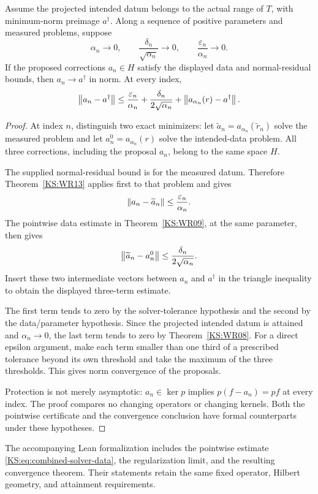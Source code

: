 \begin{KStheorem}\label{KS:WR16}
Assume the projected intended datum belongs to the actual range of $T$, with minimum-norm preimage $a^\dagger$. Along a sequence of positive parameters and measured problems, suppose
\[
 \alpha_n\to0,\qquad
 \frac{\delta_n}{\sqrt{\alpha_n}}\to0,\qquad
 \frac{\varepsilon_n}{\alpha_n}\to0.
\]
If the proposed corrections $a_n\in H$ satisfy the displayed data and normal-residual bounds, then $a_n\to a^\dagger$ in norm. At every index,
\[
 \left\lVert a_n-a^\dagger\right\rVert
 \le\frac{\varepsilon_n}{\alpha_n}
      +\frac{\delta_n}{2\sqrt{\alpha_n}}
      +\left\lVert a_{\alpha_n}(r)-a^\dagger\right\rVert.
\]
\end{KStheorem}
\begin{proof}
At index $n$, distinguish two exact minimizers: let $\widetilde a_n=a_{\alpha_n}(\widetilde r_n)$ solve the measured problem and let $a_n^0=a_{\alpha_n}(r)$ solve the intended-data problem. All three corrections, including the proposal $a_n$, belong to the same space $H$.

The supplied normal-residual bound is for the measured datum. Therefore Theorem~\ref{KS:WR13} applies first to that problem and gives
\[
 \left\lVert a_n-\widetilde a_n\right\rVert\le\frac{\varepsilon_n}{\alpha_n}.
\]
The pointwise data estimate in Theorem~\ref{KS:WR09}, at the same parameter, then gives
\[
 \left\lVert\widetilde a_n-a_n^0\right\rVert\le\frac{\delta_n}{2\sqrt{\alpha_n}}.
\]
Insert these two intermediate vectors between $a_n$ and $a^\dagger$ in the triangle inequality to obtain the displayed three-term estimate.

The first term tends to zero by the solver-tolerance hypothesis and the second by the data/parameter hypothesis. Since the projected intended datum is attained and $\alpha_n\to0$, the last term tends to zero by Theorem~\ref{KS:WR08}. For a direct epsilon argument, make each term smaller than one third of a prescribed tolerance beyond its own threshold and take the maximum of the three thresholds. This gives norm convergence of the proposals.

Protection is not merely asymptotic: $a_n\in\ker p$ implies $p(f-a_n)=pf$ at every index. The proof compares no changing operators or changing kernels. Both the pointwise certificate and the convergence conclusion have formal counterparts under these hypotheses.
\end{proof}

The accompanying Lean formalization includes the pointwise estimate \eqref{KS:eq:combined-solver-data}, the regularization limit, and the resulting convergence theorem. Their statements retain the same fixed operator, Hilbert geometry, and attainment requirements.

